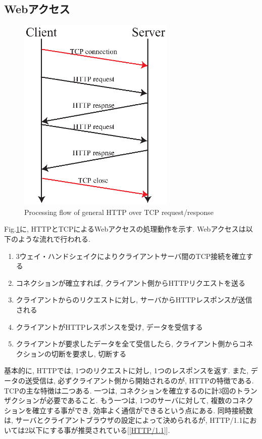 \documentclass[twocolumn]{jsarticle}
\begin{document}
\subsection{Webアクセス}
\begin{figure}[h]
  \centering
  \includegraphics[width=7.5cm]{eps/HTTP.eps}
  \caption{Processing flow of general HTTP over TCP request/response}
  \label{fig:http}
\end{figure}
Fig.\ref{fig:http}に, HTTPとTCPによるWebアクセスの処理動作を示す.
Webアクセスは以下のような流れで行われる.
\begin{enumerate}
  \item 3ウェイ・ハンドシェイクによりクライアントサーバ間のTCP接続を確立する
  \item コネクションが確立すれば, クライアント側からHTTPリクエストを送る
  \item クライアントからのリクエストに対し, サーバからHTTPレスポンスが送信される
  \item クライアントがHTTPレスポンスを受け, データを受信する
  \item クライアントが要求したデータを全て受信したら, クライアント側からコネクションの切断を要求し, 切断する
\end{enumerate}
基本的に, HTTPでは, 1つのリクエストに対し, 1つのレスポンスを返す.
また, データの送受信は, 必ずクライアント側から開始されるのが, HTTPの特徴である.
TCPの主な特徴は二つある.
一つは, コネクションを確立するのに計3回のトランザクションが必要であること.
もう一つは, 1つのサーバに対して, 複数のコネクションを確立する事ができ, 効率よく通信ができるという点にある.
同時接続数は, サーバとクライアントブラウザの設定によって決められるが,
HTTP/1.1においては2以下にする事が推奨されている[\ref{HTTP/1.1}].
\end{document}
